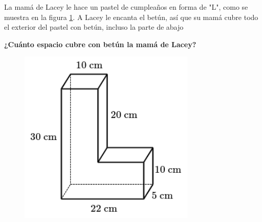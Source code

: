 \question[10] La mamá de Lacey le hace un pastel de cumpleaños en forma de "L", como se muestra en la figura \ref{fig:vol_area_02}.
A Lacey le encanta el betún, así que su mamá cubre todo el exterior del pastel con betún, incluso la parte de abajo

\textbf{¿Cuánto espacio cubre con betún la mamá de Lacey?}\\

\begin{minipage}{0.3\linewidth}
    \begin{figure}[H]
        \begin{center}
            \includegraphics[width=0.75\textwidth]{../images/vol_area_02}
        \end{center}
        \caption{}
        \label{fig:vol_area_02}
    \end{figure}
\end{minipage}
\begin{minipage}{0.7\linewidth}
    \begin{solutionbox}{6cm}
    \end{solutionbox}
\end{minipage}